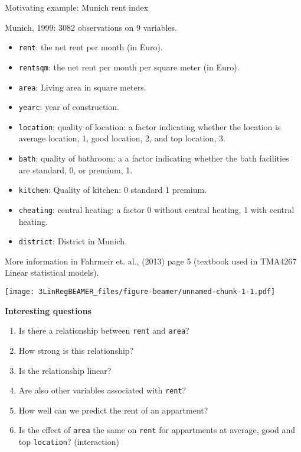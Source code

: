 \documentclass[ignorenonframetext,]{beamer}
\providecommand{\tightlist}{%
  \setlength{\itemsep}{0pt}\setlength{\parskip}{0pt}}
\begin{document}
\begin{frame}[fragile]

\begin{block}{Motivating example: Munich rent index}

Munich, 1999: 3082 observations on 9 variables.

\begin{itemize}
\tightlist
\item
  \texttt{rent}: the net rent per month (in Euro).
\item
  \texttt{rentsqm}: the net rent per month per square meter (in Euro).
\item
  \texttt{area}: Living area in square meters.
\item
  \texttt{yearc}: year of construction.
\item
  \texttt{location}: quality of location: a factor indicating whether
  the location is average location, 1, good location, 2, and top
  location, 3.
\item
  \texttt{bath}: quality of bathroom: a a factor indicating whether the
  bath facilities are standard, 0, or premium, 1.
\item
  \texttt{kitchen}: Quality of kitchen: 0 standard 1 premium.
\item
  \texttt{cheating}: central heating: a factor 0 without central
  heating, 1 with central heating.
\item
  \texttt{district}: District in Munich.
\end{itemize}

More information in Fahrmeir et. al., (2013) page 5 (textbook used in
TMA4267 Linear statistical models).

\end{block}

\end{frame}

\begin{frame}

\texttt{[image: 3LinRegBEAMER\_files/figure-beamer/unnamed-chunk-1-1.pdf]}

\end{frame}

\begin{frame}[fragile]

\textbf{Interesting questions}

\begin{enumerate}
\def\labelenumi{\arabic{enumi}.}
\tightlist
\item
  Is there a relationship between \texttt{rent} and \texttt{area}?
\item
  How strong is this relationship?
\item
  Is the relationship linear?
\item
  Are also other variables associated with \texttt{rent}?
\item
  How well can we predict the rent of an appartment?
\item
  Is the effect of \texttt{area} the same on \texttt{rent} for
  appartments at average, good and top \texttt{location}? (interaction)
\end{enumerate}

\end{frame}
\end{document}
